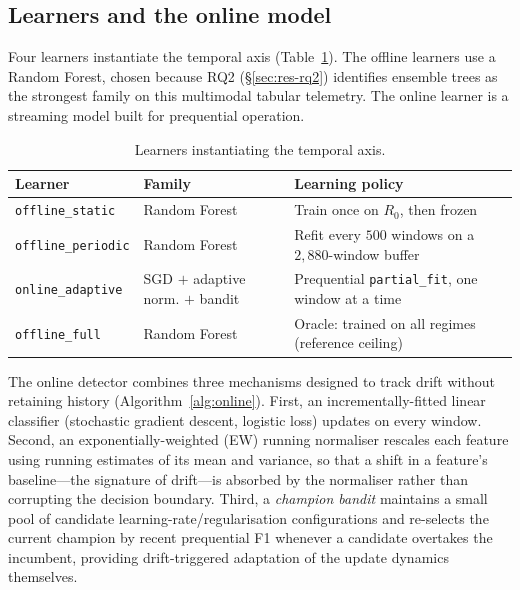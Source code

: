 \documentclass[acmsmall]{acmart}
\begin{document}
\subsection{Learners and the online model}\label{sec:method-learners}

Four learners instantiate the temporal axis (Table~\ref{tab:learners}). The offline learners use a Random Forest, chosen because RQ2 (\S\ref{sec:res-rq2}) identifies ensemble trees as the strongest family on this multimodal tabular telemetry. The online learner is a streaming model built for prequential operation.

\begin{table}[t]
\caption{Learners instantiating the temporal axis.}\label{tab:learners}
\begin{tabular}{@{}llp{}@{}}
\toprule
Learner & Family & Learning policy \\
\midrule
\texttt{offline\_static}   & Random Forest & Train once on $R_0$, then frozen \\
\texttt{offline\_periodic} & Random Forest & Refit every $500$ windows on a $2{,}880$-window buffer \\
\texttt{online\_adaptive}  & SGD ${+}$ adaptive norm. ${+}$ bandit & Prequential \texttt{partial\_fit}, one window at a time \\
\texttt{offline\_full}     & Random Forest & Oracle: trained on all regimes (reference ceiling) \\
\bottomrule
\end{tabular}
\end{table}

The online detector combines three mechanisms designed to track drift without retaining history (Algorithm~\ref{alg:online}). First, an incrementally-fitted linear classifier (stochastic gradient descent, logistic loss) updates on every window. Second, an exponentially-weighted (EW) running normaliser rescales each feature using running estimates of its mean and variance, so that a shift in a feature's baseline---the signature of drift---is absorbed by the normaliser rather than corrupting the decision boundary. Third, a \emph{champion bandit} maintains a small pool of candidate learning-rate/regularisation configurations and re-selects the current champion by recent prequential F1 whenever a candidate overtakes the incumbent, providing drift-triggered adaptation of the update dynamics themselves.
\end{document}
